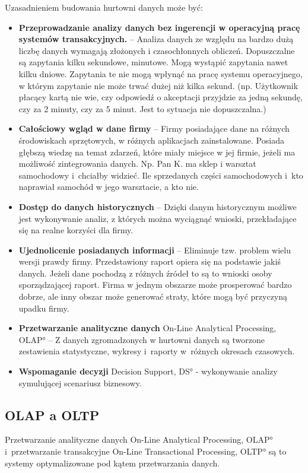       Uzasadnieniem budowania hurtowni danych może być:
\begin{itemize}
 \item \textbf{Przeprowadzanie analizy danych bez ingerencji w operacyjną pracę systemów transakcyjnych.} --
    Analiza danych ze względu na bardzo dużą liczbę danych wymagają złożonych i czasochłonnych obliczeń.
    Dopuszczalne są zapytania kilku sekundowe, minutowe. Mogą wystąpić zapytania nawet kilku dniowe. 
    Zapytania te nie mogą wpłynąć na pracę systemu operacyjnego,
     w którym zapytanie nie może trwać dużej niż kilka sekund.
    (np. Użytkownik płacący kartą nie wie, czy odpowiedź o akceptacji przyjdzie za jedną sekundę, 
    czy za 2 minuty, czy za 5 minut.
    Jest to sytuacja nie dopuszczalna.)
\item \textbf{Całościowy wgląd w dane firmy} --
    Firmy posiadające dane na różnych środowiskach sprzętowych, w różnych aplikacjach zainstalowane.
    Posiada głębszą wiedzę na temat zdarzeń, które miały miejsce w jej firmie, jeżeli ma możliwość zintegrowania danych.
    Np. Pan K. ma sklep i warsztat samochodowy i~chciałby widzieć. 
    Ile sprzedanych części samochodowych i~kto naprawiał samochód w jego warsztacie, a kto nie.
\item \textbf{Dostęp do danych historycznych} -- 
   Dzięki danym historycznym możliwe jest wykonywanie analiz,
    z których można wyciągnąć wnioski, przekładające się na realne korzyści dla firmy.
\item \textbf{Ujednolicenie posiadanych informacji} -- 
   Eliminuje tzw. problem wielu wersji prawdy firmy. 
   Przedstawiony raport opiera się na podstawie jakiś danych. 
   Jeżeli dane pochodzą z różnych źródeł to są to wnioski osoby sporządzającej raport.
   Firma w jednym obszarze może prosperować bardzo dobrze,
    ale inny obszar może generować straty, które mogą być przyczyną upadku firmy.

\item \textbf{Przetwarzanie analityczne danych} \ang{On-Line Analytical Processing, OLAP} --  
  Z danych zgromadzonych w hurtowni danych są tworzone zestawienia statystyczne,
   wykresy i~raporty w~różnych okresach czasowych.
\item \textbf{Wspomaganie decyzji} \ang{Decision Support, DS} - wykonywanie 
  analizy symulującej scenariusz biznesowy. 
  
\end{itemize}


\subsection{OLAP a OLTP}
Przetwarzanie analityczne danych \ang{On-Line Analytical Processing, OLAP} 
 i~przetwarzanie transakcyjne \ang{On-Line Transactional Processing,  OLTP}
 są to systemy optymalizowane pod kątem przetwarzania danych.

